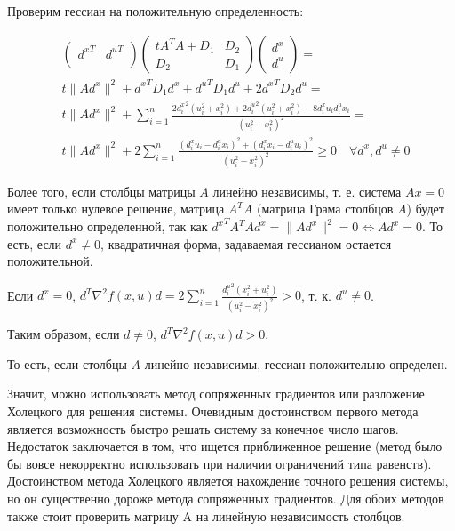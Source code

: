 \documentclass[11pt]{article}
\begin{document}
Проверим гессиан на положительную определенность:

\begin{align*}
&
\begin{pmatrix}
		{d^x}^T & {d^u}^T \\
\end{pmatrix}
\begin{pmatrix}
		t A^T A + D_1 &  D_2 \\
		D_2 					&  D_1
\end{pmatrix}
\begin{pmatrix}
		{d^x} \\ {d^u}
\end{pmatrix} = 
\\
& t \|Ad^x\|^2 + {d^x}^T D_1 d^x + {d^u}^T D_1 d^u + 2 {d^x}^T D_2 d^u = 
\\
& t \|Ad^x\|^2 + \sum_{i=1}^n \frac{2{d_i^x}^2(u_i^2 + x_i^2) + 2{d_i^u}^2(u_i^2 + x_i^2) - 8d_i^xu_id_i^ux_i}{(u_i^2 - x_i^2)^2} = \\
& t \|Ad^x\|^2 + 2 \sum_{i=1}^n \frac{\left(d_i^x u_i - d_i^u x_i\right)^2 + 
\left(d_i^x x_i - d_i^u u_i\right)^2}{(u_i^2 - x_i^2)^2} \ge 0 \quad \forall d^x, d^u \neq 0
\end{align*}

Более того, если столбцы матрицы $A$ линейно независимы, т. е. система $Ax=0$ имеет только нулевое решение, матрица $A^TA$ (матрица Грама столбцов $A$) будет положительно определенной, так как ${d^x}^T A^T A d^x = \|Ad^x\|^2 = 0 \iff Ad^x = 0$.
То есть, если $d^x \neq 0$, квадратичная форма, задаваемая гессианом остается положительной.

	Если $d^x = 0$, $d^T\nabla^2 f(x, u) d = 2 \sum_{i=1}^n \frac{{d_i^u}^2 \left(x_i^2 + 
u_i^2 \right)}{(u_i^2 - x_i^2)^2} > 0$, т. к. $d^u \neq 0$.

Таким образом, если $d \neq 0$, $d^T\nabla^2 f(x, u) d > 0$.

То есть, если столбцы $A$ линейно независимы, гессиан положительно определен.


Значит, можно использовать метод сопряженных градиентов или разложение Холецкого для решения системы.  Очевидным достоинством первого метода является возможность быстро решать систему за конечное число шагов. Недостаток заключается в том, что ищется приближенное решение (метод было бы вовсе некорректно использовать при наличии ограничений типа равенств). Достоинством метода Холецкого является нахождение точного решения системы, но он существенно дороже метода сопряженных градиентов. Для обоих методов также стоит проверить матрицу A на линейную независимость столбцов.
\end{document}
